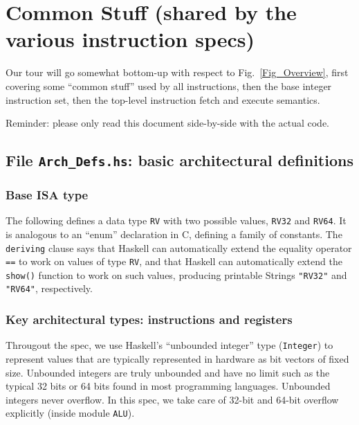 \documentclass[11pt]{article}
\begin{document}
\section{Common Stuff (shared by the various instruction specs)}

\label{sec_common_stuff}

Our tour will go somewhat bottom-up with respect to
Fig.~\ref{Fig_Overview}, first covering some ``common stuff'' used by
all instructions, then the base integer instruction set, then the
top-level instruction fetch and execute semantics.

Reminder: please only read this document side-by-side with the actual code.


\subsection{File {\tt Arch\_Defs.hs}: basic architectural definitions}

\label{sec_arch_defs}


\subsubsection{Base ISA type}

The following defines a data type {\tt RV} with two possible values,
{\tt RV32} and {\tt RV64}.  It is analogous to an ``enum'' declaration
in C, defining a family of constants.  The {\tt deriving} clause says
that Haskell can automatically extend the equality operator {\tt ==}
to work on values of type {\tt RV}, and that Haskell can automatically
extend the {\tt show()} function to work on such values, producing
printable Strings {\tt "RV32"} and {\tt "RV64"}, respectively.




\subsubsection{Key architectural types: instructions and registers}

Througout the spec, we use Haskell's ``unbounded integer'' type
(\verb'Integer') to represent values that are typically represented in
hardware as bit vectors of fixed size.  Unbounded integers are truly
unbounded and have no limit such as the typical 32 bits or 64 bits
found in most programming languages.  Unbounded integers never
overflow. In this spec, we take care of 32-bit and 64-bit overflow
explicitly (inside module \verb|ALU|).
\end{document}
